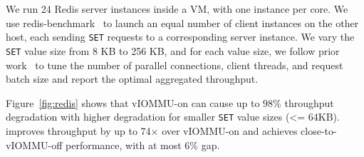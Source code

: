     




We run 24 Redis server instances inside a VM, with one instance per core. 
We use redis-benchmark~\cite{redis-benchmark} to launch an equal number of client instances on the other host,
    each sending \texttt{SET} requests to a corresponding server instance. 
We vary the \texttt{SET} value size from 8 KB to 256 KB, and 
    for each value size, we follow prior work~\cite{Rubin2024FastSafe} 
    to tune the number of parallel connections, client threads, and request batch size
    and report the optimal aggregated throughput.


Figure~\ref{fig:redis} shows that vIOMMU-on
can cause up to $98\%$ throughput degradation
with higher degradation for smaller \texttt{SET} value sizes (<= 64KB).
\brand improves throughput by up to 74$\times$ over vIOMMU-on 
    and achieves close-to-vIOMMU-off performance, with at most 6\% gap.



